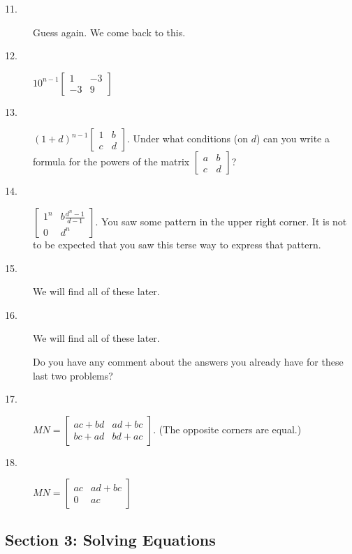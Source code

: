 \documentclass{article}
\begin{document}
\begin{description}
  \item[11.] Guess again. We come back to this.

  \item[12.] $10^{n-1} \begin{bmatrix} 1 & -3 \\ -3 & 9 \end{bmatrix}$

  \item[13.] $(1+d)^{n-1} \begin{bmatrix} 1 & b \\ c & d \end{bmatrix}$. Under what conditions (on $d$) can you write a formula for the powers of the matrix $\begin{bmatrix} a & b \\ c &d \end{bmatrix}$?

  \item[14.] $\begin{bmatrix} 1^n & b\frac{d^n-1}{d-1} \\ 0 & d^n \end{bmatrix}$. You saw some pattern in the upper right corner. It is not to be expected that you saw this terse way to express that pattern.

  \item[15.] We will find all of these later.

  \item[16.] We will find all of these later. 

    Do you have any comment about the answers you already have for these last two problems?

  \item[17.] $MN = \begin{bmatrix} ac+bd & ad+bc \\ bc+ad & bd+ac \end{bmatrix}$. (The opposite corners are equal.)

  \item[18.] $MN = \begin{bmatrix} ac & ad+bc \\ 0 & ac \end{bmatrix}$

\end{description}


\subsection*{Section 3: Solving Equations}
\end{document}
